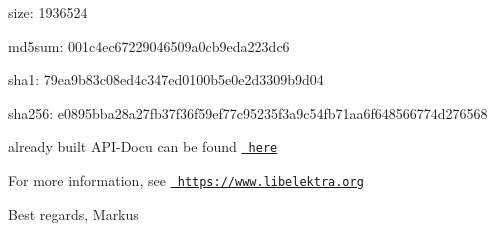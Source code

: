 \begin{DoxyItemize}
\item size\+: 1936524
\item md5sum\+: 001c4ec67229046509a0cb9eda223dc6
\item sha1\+: 79ea9b83c08ed4c347ed0100b5e0e2d3309b9d04
\item sha256\+: e0895bba28a27fb37f36f59ef77c95235f3a9c54fb71aa6f648566774d276568
\end{DoxyItemize}

already built A\+P\+I-\/\+Docu can be found \href{https://doc.libelektra.org/api/0.8.9/html/}{\texttt{ here}}

For more information, see \href{https://www.libelektra.org}{\texttt{ https\+://www.\+libelektra.\+org}}

Best regards, Markus 